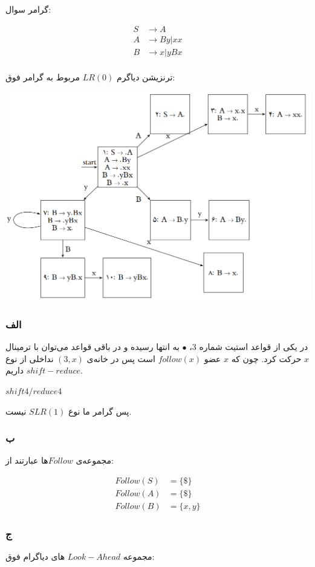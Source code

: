 گرامر سوال:

\begin{align*}
	S&\rightarrow A \\
	A&\rightarrow By|xx \\
	B&\rightarrow x|yBx \\
\end{align*}


ترنزیشن دیاگرم
$LR(0)$
مربوط به گرامر فوق:

\qquad\qquad\qquad\includegraphics[width=0.7\linewidth]{figs/3.png}



\subsubsection*{الف}

در یکی از قواعد استیت‌ شماره 3، 
$\bullet$
به انتها رسیده و در باقی قواعد می‌توان با ترمینال $x$ حرکت کرد. چون که $x$ عضو $follow(x)$ است پس در خانه‌ی  $(3,x)$ نداخلی از نوع $shift-reduce$ داریم.

\setLTR
$
shift 4 / reduce 4
$
\setRTL

پس گرامر ما نوع $SLR(1)$ نیست.

\subsubsection*{ب}

مجموعه‌ی $Follow$ها عبارتند از:

\begin{align*}
	Follow(S)&=\{\$\} \\
	Follow(A)&=\{\$\} \\
	Follow(B)&=\{x,y\} 
\end{align*}
\pagebreak

\subsubsection*{ج}
مجموعه 
$Look-Ahead$
های دیاگرام فوق:

